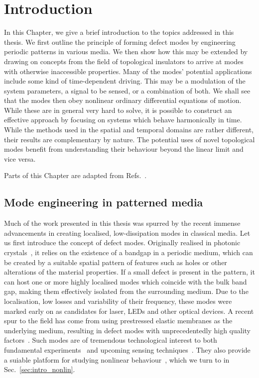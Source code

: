 
\chapter{Introduction} \label{ch:intro} 

\begin{chapterabstract}
	
	In this Chapter, we give a brief introduction to the topics addressed in this thesis. We first outline the principle of forming defect modes by engineering periodic patterns in various media. We then show how this may be extended by drawing on concepts from the field of topological insulators to arrive at modes with otherwise inaccessible properties. 
	Many of the modes' potential applications include some kind of time-dependent driving. This may be a modulation of the system parameters, a signal to be sensed, or a combination of both. We shall see that the modes then obey nonlinear ordinary differential equations of motion. While these are in general very hard to solve, it is possible to construct an effective approach by focusing on systems which behave harmonically in time.
	While the methods used in the spatial and temporal domains are rather different, their results are complementary by nature. The potential uses of novel topological modes benefit from understanding their behaviour beyond the linear limit and vice versa.

	\tcblower
	Parts of this Chapter are adapted from Refs.~\cite{Kosata_2022a, Kosata_2021}.
\end{chapterabstract}

\section{Mode engineering in patterned media} \label{sec:intro_spatial}

Much of the work presented in this thesis was spurred by the recent immense advancements in creating localised, low-dissipation modes in classical media. Let us first introduce the concept of defect modes. Originally realised in photonic crystals~\cite{Joannopoulos_1997}, it relies on the existence of a bandgap in a periodic medium, which can be created by a suitable spatial pattern of features such as holes or other alterations of the material properties. If a small defect is present in the pattern, it can host one or more highly localised modes which coincide with the bulk band gap, making them effectively isolated from the surrounding medium. Due to the localisation, low losses and variability of their frequency, these modes were marked early on as candidates for laser, LEDs and other optical devices. A recent spur to the field has come from using prestressed elastic membranes as the underlying medium, resulting in defect modes with unprecedentedly high quality factors~\cite{Tsaturyan_2017}. Such modes are of tremendous technological interest to both fundamental experiments~\cite{Mason_2019, Rossi_2018} and upcoming sensing techniques~\cite{Haelg_2022, Haelg_2021, Kosata_2020}. They also provide a suiable platform for studying nonlinear behaviour~\cite{Catalini_2021}, which we turn to in Sec.~\ref{sec:intro_nonlin}. 

